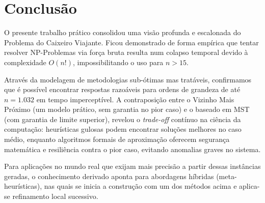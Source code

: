 \documentclass[12pt,a4paper]{article}
\begin{document}
\section{Conclusão}

O presente trabalho prático consolidou uma visão profunda e escalonada do Problema do Caixeiro Viajante. Ficou demonstrado de forma empírica que tentar resolver NP-Problemas via força bruta resulta num colapso temporal devido à complexidade $O(n!)$, impossibilitando o uso para $n > 15$.

Através da modelagem de metodologias sub-ótimas mas tratáveis, confirmamos que é possível encontrar respostas razoáveis para ordens de grandeza de até $n=1.032$ em tempo imperceptível. A contraposição entre o Vizinho Mais Próximo (um modelo prático, sem garantia no pior caso) e o baseado em MST (com garantia de limite superior), revelou o \textit{trade-off} contínuo na ciência da computação: heurísticas gulosas podem encontrar soluções melhores no caso médio, enquanto algoritmos formais de aproximação oferecem segurança matemática e resiliência contra o pior caso, evitando anomalias graves no sistema.

Para aplicações no mundo real que exijam mais precisão a partir dessas instâncias geradas, o conhecimento derivado aponta para abordagens híbridas (meta-heurísticas), nas quais se inicia a construção com um dos métodos acima e aplica-se refinamento local sucessivo.
\end{document}
